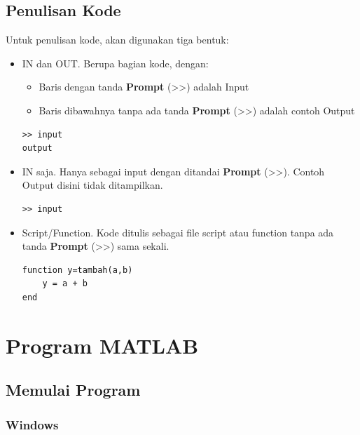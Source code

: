 \documentclass[12pt]{book}
\begin{document}
	\section{Penulisan Kode}
	Untuk penulisan kode, akan digunakan tiga bentuk:
	\begin{itemize}
		\item IN dan OUT. Berupa bagian kode, dengan:
		\begin{itemize}
			\item Baris dengan tanda \textbf{Prompt} (>>) adalah Input
			\item Baris dibawahnya tanpa ada tanda \textbf{Prompt} (>>) adalah contoh Output
		\end{itemize}
	
		\begin{verbatim}
>> input
output
		\end{verbatim}
	
		\item IN saja. Hanya sebagai input dengan ditandai \textbf{Prompt} (>>).
		Contoh Output disini tidak ditampilkan.
		
		\begin{verbatim}
>> input
		\end{verbatim}
	
		\item Script/Function. Kode ditulis sebagai file script atau function tanpa ada tanda \textbf{Prompt} (>>) sama sekali.
		
		\begin{verbatim}
function y=tambah(a,b)
	y = a + b
end
		\end{verbatim}
\end{itemize}
	
	
	\newpage
	\mainmatter
	\chapter{Program MATLAB}
	
	\section{Memulai Program}
	\subsection{Windows}
\end{document}
